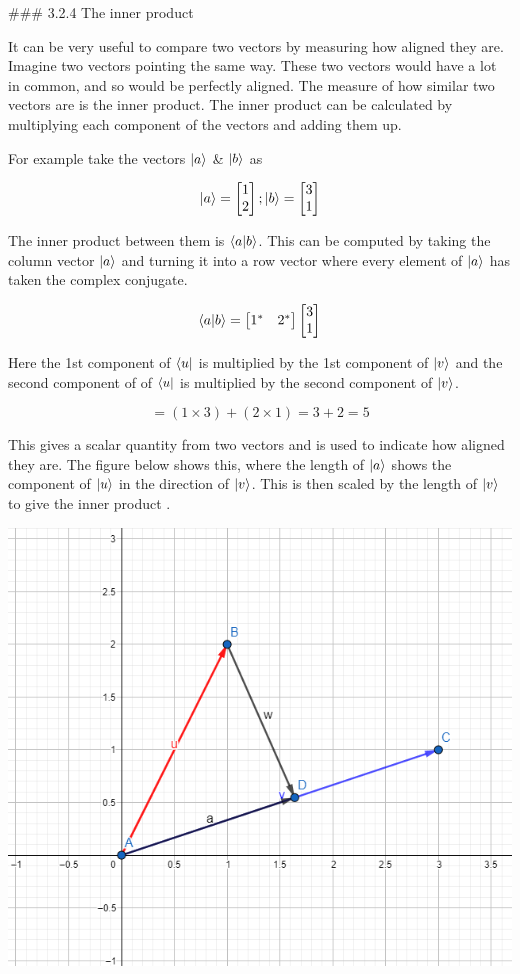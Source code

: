 \documentclass{book}
\begin{document}
### 3.2.4 The inner product  

It can be very useful to compare two vectors by measuring how aligned they are. Imagine two vectors pointing the same way. These two vectors would have a lot in common, and so would be perfectly aligned. The measure of how similar two vectors are is the inner product. The inner product can be calculated by multiplying each component of the vectors and adding them up. 

For example take the vectors $\ket{a}$ & $\ket{b}$ as 

 $$
 \ket{a} = \begin{bmatrix} 1 \\ 2 \end{bmatrix} ;  \ket{b} = \begin{bmatrix} 3 \\ 1 \end{bmatrix} 
 $$

 The inner product between them is $\braket{a|b}$. This can be computed by taking the column vector $\ket{a}$ and turning it into a row vector where every element of $\ket{a}$ has taken the complex conjugate. 

 $$
\braket{a|b} = \begin{bmatrix} 1^* & 2^* \end{bmatrix}  \begin{bmatrix} 3 \\ 1 \end{bmatrix}
 $$

Here the 1st component of $\bra{u}$ is multiplied by the 1st component of $\ket{v}$ and the second component of of $\bra{u}$ is multiplied by the second component of $\ket{v}$.

$$
= (1 \times 3) + (2 \times 1) = 3 + 2 = 5 
$$

This gives a scalar quantity from two vectors and is used to indicate how aligned they are. The figure below shows this, where the length of $\ket{a}$ shows the component of $\ket{u}$ in the direction of $\ket{v}$. This is then scaled by the length of $\ket{v}$ to give the inner product . 

\includegraphics{images/Dot_product_visualisation.png}
\end{document}

